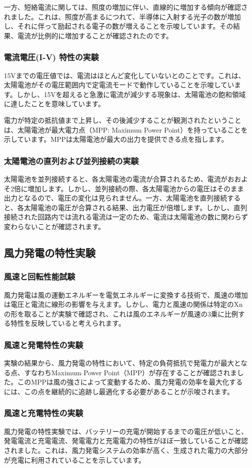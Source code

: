 \documentclass[a4paper,11pt,xelatex,ja=standard]{bxjsarticle}
\begin{document}
            一方、短絡電流に関しては、照度の増加に伴い、直線的に増加する傾向が確認されました。これは、照度が高まるにつれて、半導体に入射する光子の数が増加し、それに伴って励起される電子の数が増えることを示唆しています。その結果、電流が比例的に増加することが確認されたのです。
        \subsubsection{電流電圧(I-V) 特性の実験}
            15Vまでの電圧値では、電流はほとんど変化していないとのことです。これは、太陽電池がその電圧範囲内で定電流モードで動作していることを示唆しています。しかし、15Vを超えると急激に電流が減少する現象は、太陽電池の飽和領域に達したことを意味しています。
        
            電力が特定の抵抗値まで上昇し、その後減少することが観測されたということは、太陽電池が最大電力点（MPP: Maximum Power Point）を持っていることを示しています。MPPは太陽電池が最大の出力を提供できる点を指します。
        \subsubsection{太陽電池の直列および並列接続の実験}
            太陽電池を並列接続すると、各太陽電池の電流が合算されるため、電流がおおよそ2倍に増加します。しかし、並列接続の際、各太陽電池からの電圧はそのまま出力となるので、電圧の変化は見られません。一方、太陽電池を直列接続すると、各太陽電池の電圧が合算される結果、出力電圧が倍増します。しかし、直列接続された回路内では流れる電流は一定のため、電流は太陽電池の数に関わらず変わらないことが確認されます。
        
    \subsection{風力発電の特性実験}
        \subsubsection{風速と回転性能試験}
            風力発電は風の運動エネルギーを電気エネルギーに変換する技術で、風速の増加は電圧と電流に線形の影響を与えます。しかし、電力と風速の関係は特定のXnの形を取ることが実験で確認され、これは風のエネルギーが風速の3乗に比例する特性を反映していると考えられます。
        \subsubsection{風速と発電特性の実験}
            実験の結果から、風力発電の特性において、特定の負荷抵抗で発電力が最大となる点、すなわちMaximum Power Point（MPP）が存在することが確認されました。このMPPは風の強さによって変動するため、風力発電の効率を最大化するには、この点を継続的に追跡し最適化する必要があることが示唆されます。
        \subsubsection{風速と充電特性の実験}
            風力発電の特性実験では、バッテリーの充電が開始するまでの電圧が低いこと、発電電流と充電電流、発電電力と充電電力の特性がほぼ一致していることが確認されました。これは、風力発電システムの効率が高く、生成された電力の大部分が充電に利用されていることを示しています。
\end{document}
